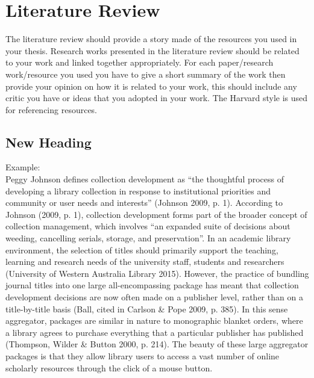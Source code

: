 \chapter{Literature Review}

\begin{justify}
The literature review should provide a story made of the resources you used in your thesis. Research works presented in the literature review should be related to your work and linked together appropriately.  For each paper/research work/resource you used you have to give a short summary of the work then provide your opinion on how it is related to your work, this should include any critic you have or ideas that you adopted in your work.  The Harvard style is used for referencing resources.
\end{justify}

\section{New Heading}
\begin{justify}
Example: \\
Peggy Johnson defines collection development as “the thoughtful process of developing a library collection in response to institutional priorities and community or user needs and interests” (Johnson 2009, p. 1).  According to Johnson (2009, p. 1), collection development forms part of the broader concept of collection management, which involves “an expanded suite of decisions about weeding, cancelling serials, storage, and preservation”.  In an academic library environment, the selection of titles should primarily support the teaching, learning and research needs of the university staff, students and researchers (University of Western Australia Library 2015).  However, the practice of bundling journal titles into one large all-encompassing package has meant that collection development decisions are now often made on a publisher level, rather than on a title-by-title basis (Ball, cited in Carlson \& Pope 2009, p. 385).  In this sense aggregator, packages are similar in nature to monographic blanket orders, where a library agrees to purchase everything that a particular publisher has published (Thompson, Wilder \& Button 2000, p. 214).  The beauty of these large aggregator packages is that they allow library users to access a vast number of online scholarly resources through the click of a mouse button.
\end{justify}
